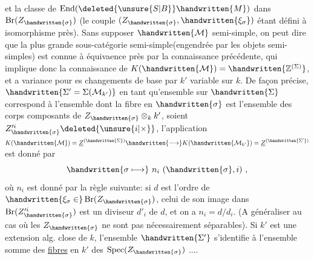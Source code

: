 et la classe de $\operatorname{End}(\deleted{\unsure{S|B}}\handwritten{M})$ dans $\operatorname{Br}(Z_{\handwritten{\sigma}})$ (le couple $(Z_{\handwritten{\sigma}},\handwritten{\xi_\sigma})$ étant défini à isomorphisme près). Sans supposer $\handwritten{\mathcal{M}}$ semi\handwritten{\unsure{(}}-simple, on peut dire que la plus grande sous-catégorie semi-simple(engendrée par les objets semi-simples) est connue à équivaence près par la connaissance précédente, qui implique donc la connaissance de $K(\handwritten{\mathcal{M}})=\handwritten{\mathbb{Z}^{(\Sigma)}}$, et a variance pour es changements de base par $k'$ variable sur $k$. De façon précise,$\handwritten{\Sigma'=\Sigma(\mathcal{M}_{k'})}$ en tant qu'ensemble sur $\handwritten{\Sigma}$ correspond à l'ensemble  dont la fibre  en $\handwritten{\sigma}$ est l'ensemble des corps composants de $Z_{\handwritten{\sigma}}\otimes_k k'$, soient $Z'^{i}_{\handwritten{\sigma}}\deleted{\unsure{i|\times}}$, l'application $K(\handwritten{\mathcal{M}})=\underline{Z}^{(\handwritten{\Sigma})}\handwritten{\longrightarrow}K(\handwritten{\mathcal{M}_{k'}})=\underline{Z}^{(\handwritten{\Sigma'})}$ est donné par
\[
\handwritten{\sigma\longmapsto}\ n_i\ (\handwritten{\sigma},i)\ ,
\]
où $n_i$ est donné par la règle suivante: si $d$ est  l'ordre de $\handwritten{\xi_\sigma\in}\operatorname{Br}(Z_{\handwritten{\sigma}})$, celui de son image dans $\operatorname{Br}(Z'^{i}_{\handwritten{\sigma}})$ est un  diviseur $d'_i$ de $d$, et on a $n_i=d/d_i$. (A généraliser au cas où les $Z_{\handwritten{\sigma}}$ ne sont pas nécessairement séparables). Si $k'$ est une  extension alg. close de $k$, l'ensemble $\handwritten{\Sigma'}$ s'identifie à l'ensemble somme des \uline{fibres} en $k'$ des $\operatorname{Spec}(Z_{\handwritten{\sigma}})$ ....


